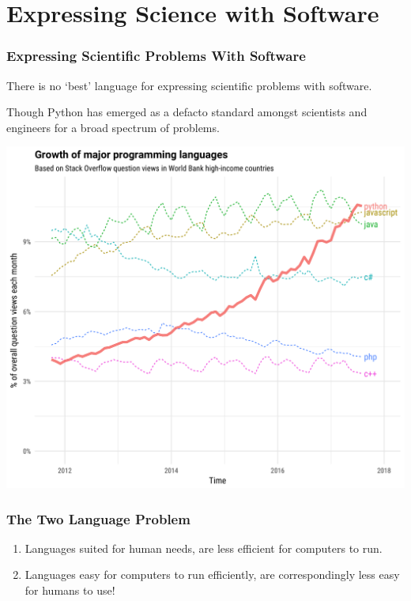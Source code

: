 \section{Expressing Science with Software}

\begin{frame}
    \frametitle{Expressing Scientific Problems With Software}

    There is no `best' language for expressing scientific problems with software.

    \vline

    Though Python has emerged as a defacto standard amongst scientists and engineers
    for a broad spectrum of problems.

\end{frame}

\begin{frame}
    \includegraphics[width=0.95\linewidth]{assets/major_language_growth.png}
\end{frame}

\begin{frame}
    \frametitle{The Two Language Problem}
    \begin{enumerate}
        \item Languages suited for human needs, are less efficient for computers to run.
        \item Languages easy for computers to run efficiently, are correspondingly less easy for humans to use!
    \end{enumerate}
\end{frame}

